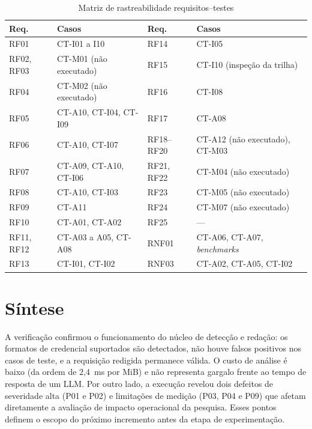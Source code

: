 \begin{table}[htb]
\centering
\caption{Matriz de rastreabilidade requisitos--testes}\label{tab:rastreio}
\small
\begin{tabular}{|p{1.5cm}|p{4.7cm}|p{1.5cm}|p{4.7cm}|}
\hline
\textbf{Req.} & \textbf{Casos} & \textbf{Req.} & \textbf{Casos} \\ \hline
RF01 & CT-I01 a I10 & RF14 & CT-I05 \\ \hline
RF02, RF03 & CT-M01 (não executado) & RF15 & CT-I10 (inspeção da trilha) \\ \hline
RF04 & CT-M02 (não executado) & RF16 & CT-I08 \\ \hline
RF05 & CT-A10, CT-I04, CT-I09 & RF17 & CT-A08 \\ \hline
RF06 & CT-A10, CT-I07 & RF18--RF20 & CT-A12 (não executado), CT-M03 \\ \hline
RF07 & CT-A09, CT-A10, CT-I06 & RF21, RF22 & CT-M04 (não executado) \\ \hline
RF08 & CT-A10, CT-I03 & RF23 & CT-M05 (não executado) \\ \hline
RF09 & CT-A11 & RF24 & CT-M07 (não executado) \\ \hline
RF10 & CT-A01, CT-A02 & RF25 & --- \\ \hline
RF11, RF12 & CT-A03 a A05, CT-A08 & RNF01 & CT-A06, CT-A07, \textit{benchmarks} \\ \hline
RF13 & CT-I01, CT-I02 & RNF03 & CT-A02, CT-A05, CT-I02 \\ \hline
\end{tabular}
\end{table}

\section{Síntese}

A verificação confirmou o funcionamento do núcleo de detecção e redação: os formatos de credencial suportados são detectados, não houve falsos positivos nos casos de teste, e a requisição redigida permanece válida. O custo de análise é baixo (da ordem de 2,4~ms por MiB) e não representa gargalo frente ao tempo de resposta de um LLM. Por outro lado, a execução revelou dois defeitos de severidade alta (P01 e P02) e limitações de medição (P03, P04 e P09) que afetam diretamente a avaliação de impacto operacional da pesquisa. Esses pontos definem o escopo do próximo incremento antes da etapa de experimentação.
